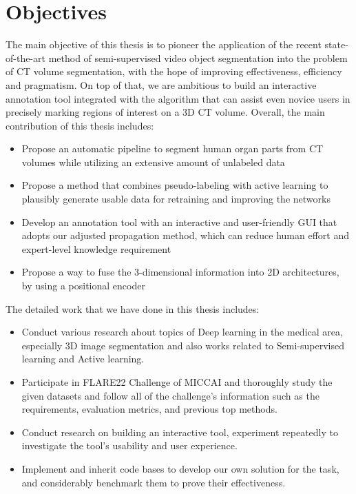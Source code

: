 \section{Objectives}
\label{sec:objectives}


The main objective of this thesis is to pioneer the application of the recent state-of-the-art method of semi-supervised video object segmentation into the problem of CT volume segmentation, with the hope of improving effectiveness, efficiency and pragmatism. On top of that, we are ambitious to build an interactive annotation tool integrated with the algorithm that can assist even novice users in precisely marking regions of interest on a 3D CT volume. Overall, the main contribution of this thesis includes:

\begin{itemize}
    \item Propose an automatic pipeline to segment human organ parts from CT volumes while utilizing an extensive amount of unlabeled data
    
    \item Propose a method that combines pseudo-labeling with active learning to plausibly generate usable data for retraining and improving the networks
    
    \item Develop an annotation tool with an interactive and user-friendly GUI that adopts our adjusted propagation method, which can reduce human effort and expert-level knowledge requirement
    
    \item Propose a way to fuse the 3-dimensional information into 2D architectures, by using a positional encoder
    
\end{itemize}
The detailed work that we have done in this thesis includes:
\begin{itemize}
    \item Conduct various research about topics of Deep learning in the medical area, especially 3D image segmentation and also works related to Semi-supervised learning and Active learning. 
    \item Participate in FLARE22 Challenge of MICCAI and thoroughly study the given datasets and follow all of the challenge's information such as the requirements, evaluation metrics, and previous top methods.
    \item Conduct research on building an interactive tool, experiment repeatedly to investigate the tool's usability and user experience.
    \item Implement and inherit code bases to develop our own solution for the task, and considerably benchmark them to prove their effectiveness.
\end{itemize}
